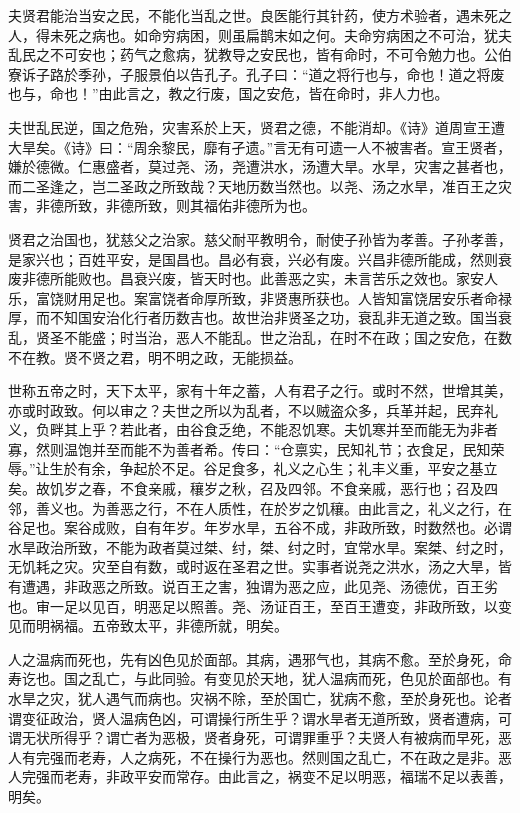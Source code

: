 \documentclass[]{article}
\begin{document}
夫贤君能治当安之民，不能化当乱之世。良医能行其针药，使方术验者，遇未死之人，得未死之病也。如命穷病困，则虽扁鹊末如之何。夫命穷病困之不可治，犹夫乱民之不可安也；药气之愈病，犹教导之安民也，皆有命时，不可令勉力也。公伯寮诉子路於季孙，子服景伯以告孔子。孔子曰：``道之将行也与，命也！道之将废也与，命也！''由此言之，教之行废，国之安危，皆在命时，非人力也。

夫世乱民逆，国之危殆，灾害系於上天，贤君之德，不能消却。《诗》道周宣王遭大旱矣。《诗》曰：``周余黎民，靡有孑遗。''言无有可遗一人不被害者。宣王贤者，嫌於德微。仁惠盛者，莫过尧、汤，尧遭洪水，汤遭大旱。水旱，灾害之甚者也，而二圣逢之，岂二圣政之所致哉？天地历数当然也。以尧、汤之水旱，准百王之灾害，非德所致，非德所致，则其福佑非德所为也。

贤君之治国也，犹慈父之治家。慈父耐平教明令，耐使子孙皆为孝善。子孙孝善，是家兴也；百姓平安，是国昌也。昌必有衰，兴必有废。兴昌非德所能成，然则衰废非德所能败也。昌衰兴废，皆天时也。此善恶之实，未言苦乐之效也。家安人乐，富饶财用足也。案富饶者命厚所致，非贤惠所获也。人皆知富饶居安乐者命禄厚，而不知国安治化行者历数吉也。故世治非贤圣之功，衰乱非无道之致。国当衰乱，贤圣不能盛；时当治，恶人不能乱。世之治乱，在时不在政；国之安危，在数不在教。贤不贤之君，明不明之政，无能损益。

世称五帝之时，天下太平，家有十年之蓄，人有君子之行。或时不然，世增其美，亦或时政致。何以审之？夫世之所以为乱者，不以贼盗众多，兵革并起，民弃礼义，负畔其上乎？若此者，由谷食乏绝，不能忍饥寒。夫饥寒并至而能无为非者寡，然则温饱并至而能不为善者希。传曰：``仓禀实，民知礼节；衣食足，民知荣辱。''让生於有余，争起於不足。谷足食多，礼义之心生；礼丰义重，平安之基立矣。故饥岁之春，不食亲戚，穰岁之秋，召及四邻。不食亲戚，恶行也；召及四邻，善义也。为善恶之行，不在人质性，在於岁之饥穰。由此言之，礼义之行，在谷足也。案谷成败，自有年岁。年岁水旱，五谷不成，非政所致，时数然也。必谓水旱政治所致，不能为政者莫过桀、纣，桀、纣之时，宜常水旱。案桀、纣之时，无饥耗之灾。灾至自有数，或时返在圣君之世。实事者说尧之洪水，汤之大旱，皆有遭遇，非政恶之所致。说百王之害，独谓为恶之应，此见尧、汤德优，百王劣也。审一足以见百，明恶足以照善。尧、汤证百王，至百王遭变，非政所致，以变见而明祸福。五帝致太平，非德所就，明矣。

人之温病而死也，先有凶色见於面部。其病，遇邪气也，其病不愈。至於身死，命寿讫也。国之乱亡，与此同验。有变见於天地，犹人温病而死，色见於面部也。有水旱之灾，犹人遇气而病也。灾祸不除，至於国亡，犹病不愈，至於身死也。论者谓变征政治，贤人温病色凶，可谓操行所生乎？谓水旱者无道所致，贤者遭病，可谓无状所得乎？谓亡者为恶极，贤者身死，可谓罪重乎？夫贤人有被病而早死，恶人有完强而老寿，人之病死，不在操行为恶也。然则国之乱亡，不在政之是非。恶人完强而老寿，非政平安而常存。由此言之，祸变不足以明恶，福瑞不足以表善，明矣。
\end{document}
